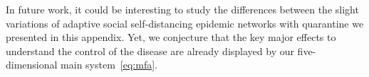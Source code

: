 \documentclass[12pt]{article}
\begin{document}
In future work, it could be interesting to study the differences between the slight variations of adaptive social self-distancing epidemic networks with quarantine we presented in this appendix. Yet, we conjecture that the key major effects to understand the control of the disease are already displayed by our five-dimensional main system~\eqref{eq:mfa}. 
\end{document}
